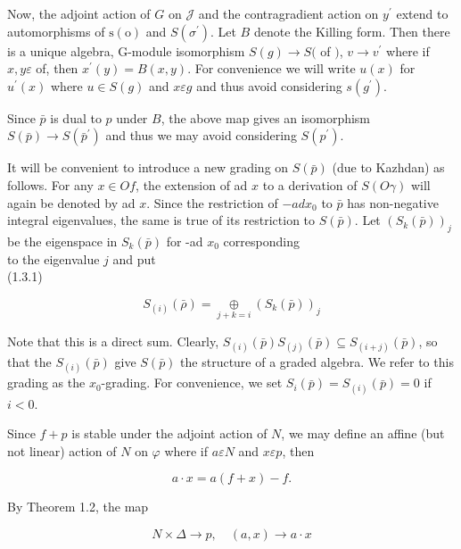 \documentclass[10pt]{article}
\begin{document}
Now, the adjoint action of $G$ on $\mathcal{J}$ and the contragradient action on $y^{\prime}$ extend to automorphisms of $\mathrm{s}(\mathrm{o})$ and $S\left(\sigma^{\prime}\right)$. Let $B$ denote the Killing form. Then there is a unique algebra, G-module isomorphism $S(g) \rightarrow S($ of $)$, $v \rightarrow v^{\prime}$ where if $x, y \varepsilon$ of, then $x^{\prime}(y)=B(x, y)$. For convenience we will write $u(x)$ for $u^{\prime}(x)$ where $u \in S(g)$ and $x \varepsilon g$ and thus avoid considering $s\left(g^{\prime}\right)$.

Since $\bar{p}$ is dual to $p$ under $B$, the above map gives an isomorphism $S(\bar{p}) \rightarrow S\left(\bar{p}^{\prime}\right)$ and thus we may avoid considering $S\left(p^{\prime}\right)$.

It will be convenient to introduce a new grading on $S(\bar{p})$ (due to Kazhdan) as follows. For any $x \in O f$, the extension of ad $x$ to a derivation of $S(O \gamma)$ will again be denoted by ad $x$. Since the restriction of $-a d x_{0}$ to $\bar{p}$ has non-negative integral eigenvalues, the same is true of its restriction to $S(\bar{p})$. Let $\left(S_{k}(\bar{p})\right)_{j}$ be the eigenspace in $S_{k}(\bar{p})$ for -ad $x_{0}$ corresponding\\
to the eigenvalue $j$ and put\\
(1.3.1)

$$
S_{(i)}(\bar{\rho})=\underset{j+k=i}{\oplus}\left(S_{k}(\bar{p})\right)_{j}
$$

Note that this is a direct sum. Clearly, $S_{(i)}(\bar{p}) S_{(j)}(\bar{p}) \subseteq S_{(i+j)}(\bar{p})$, so that the $S_{(i)}(\bar{p})$ give $S(\bar{p})$ the structure of a graded algebra. We refer to this grading as the $x_{0}$-grading. For convenience, we set $S_{i}(\bar{p})=S_{(i)}(\bar{p})=0$ if $i<0$.

Since $f+p$ is stable under the adjoint action of $N$, we may define an affine (but not linear) action of $N$ on $\varphi$ where if $a \varepsilon N$ and $x \varepsilon p$, then


\begin{equation*}
a \cdot x=a(f+x)-f . \tag{1.3.2}
\end{equation*}


By Theorem 1.2, the map


\begin{equation*}
N \times \Delta \rightarrow p, \quad(a, x) \rightarrow a \cdot x \tag{1.3.3}
\end{equation*}
\end{document}
